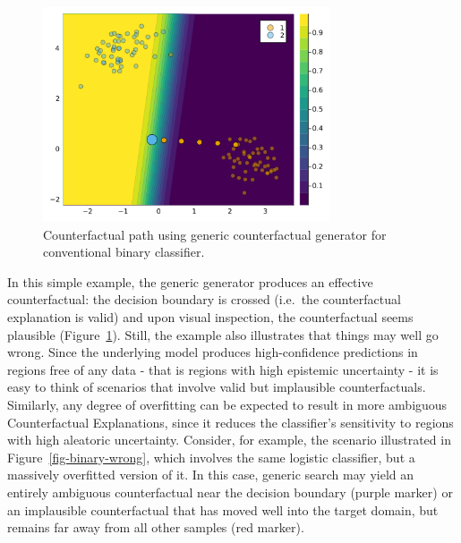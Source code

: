 \documentclass{juliacon}
\begin{document}
\begin{figure}

{\centering \includegraphics[width=3.33333in,height=2.5in]{www/ce_binary.png}

}

\caption{\label{fig-binary}Counterfactual path using generic
counterfactual generator for conventional binary classifier.}

\end{figure}

In this simple example, the generic generator produces an effective
counterfactual: the decision boundary is crossed (i.e.~the
counterfactual explanation is valid) and upon visual inspection, the
counterfactual seems plausible (Figure~\ref{fig-binary}). Still, the
example also illustrates that things may well go wrong. Since the
underlying model produces high-confidence predictions in regions free of
any data - that is regions with high epistemic uncertainty - it is easy
to think of scenarios that involve valid but implausible
counterfactuals. Similarly, any degree of overfitting can be expected to
result in more ambiguous Counterfactual Explanations, since it reduces
the classifier's sensitivity to regions with high aleatoric uncertainty.
Consider, for example, the scenario illustrated in
Figure~\ref{fig-binary-wrong}, which involves the same logistic
classifier, but a massively overfitted version of it. In this case,
generic search may yield an entirely ambiguous counterfactual near the
decision boundary (purple marker) or an implausible counterfactual that
has moved well into the target domain, but remains far away from all
other samples (red marker).
\end{document}
